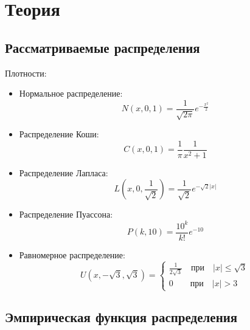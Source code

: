 \documentclass[12pt,a4paper]{article}
\begin{document}
	\newpage
	
	\section{Теория}
		\subsection{Рассматриваемые распределения}
		Плотности:
		\begin{itemize}
			\item Нормальное распределение:
			\begin{equation}\label{norm}
				\textit{N}(\textit{x}, 0, 1)=\frac{1}{\sqrt{2\pi}}e^{-\frac{x^2}{2}}
			\end{equation}
			
			\item Распределение Коши:
			\begin{equation}\label{cauchy}
				\textit{C}(\textit{x}, 0, 1)=\frac{1}{\pi}\frac{1}{x^2+1}
			\end{equation}
			
			\item Распределение Лапласа:
			\begin{equation}\label{laplace}
				\textit{L}(\textit{x}, 0, \frac{1}{\sqrt{2}})=\frac{1}{\sqrt{2}}e^{-\sqrt{2}|x|}
			\end{equation}
			
			\item Распределение Пуассона:
			\begin{equation}\label{poisson}
				\textit{P}(\textit{k}, 10)=\frac{10^k}{k!}e^{-10}
			\end{equation}
			
			\item Равномерное распределение:
			\begin{equation}\label{uniform}
				\textit{U}(\textit{x}, -\sqrt{3}, \sqrt{3})=
				\left\{
				\begin{array}{l}
					\frac{1}{2\sqrt{3}} \quad \text{при} \quad |x|\leq \sqrt{3}\\
					0 \quad \quad \text{при} \quad |x|>3
				\end{array}
				\right.
			\end{equation}
		\end{itemize}
		
		\subsection{Эмпирическая функция распределения}
\end{document}
